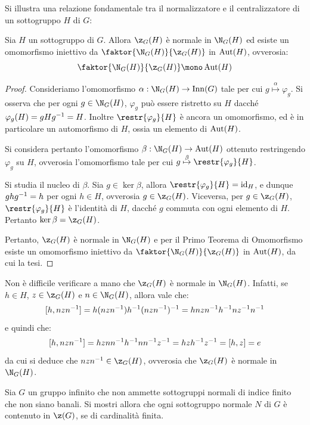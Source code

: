 \documentclass[11pt]{scrartcl}
\begin{document}
	Si illustra una relazione fondamentale tra il normalizzatore e il centralizzatore
	di un sottogruppo $H$ di $G$:
	
	\begin{proposition}
		\label{prop:norm_centr}
		Sia $H$ un sottogruppo di $G$. Allora $\z_G(H)$ è normale in $\N_G(H)$ ed
		esiste un omomorfismo iniettivo da $\faktor{\N_G(H)}{\z_G(H)}$ in
		$\operatorname{Aut}(H)$, ovverosia:
		\[ \faktor{\N_G(H)}{\z_G(H)} \mono \Aut(H) \]
	\end{proposition}
	
	\begin{proof}
		Consideriamo l'omomorfismo $\alpha : \N_G(H) \to \Inn(G)$ tale per cui
		$g \overset{\alpha}{\mapsto} \varphi_g$. Si osserva che per ogni $g \in \N_G(H)$, $\varphi_g$ può
		essere ristretto su $H$ dacché $\varphi_g(H) = gHg^{-1} = H$. Inoltre
		$\restr{\varphi_g}{H}$ è ancora un omomorfismo, ed è in particolare un
		automorfismo di $H$, ossia un elemento di $\operatorname{Aut}(H)$. \medskip
		
		
		Si considera pertanto l'omomorfismo $\beta : \N_G(H) \to \Aut(H)$ ottenuto
		restringendo $\varphi_g$ su $H$, ovverosia l'omomorfismo tale per cui
		$g \overset{\beta}{\mapsto} \restr{\varphi_g}{H}$. \medskip
		
		
		Si studia il nucleo di $\beta$. Sia $g \in \ker \beta$, allora $\restr{\varphi_g}{H} = \id_H$, e dunque $ghg^{-1} = h$ per ogni $h \in H$, ovverosia $g \in \z_G(H)$.
		Viceversa, per $g \in \z_G(H)$, $\restr{\varphi_g}{H}$ è l'identità di $H$, dacché
		$g$ commuta con ogni elemento di $H$. Pertanto $\ker \beta = \z_G(H)$. \medskip
		
		
		Pertanto, $\z_G(H)$ è normale in $\N_G(H)$ e per il Primo Teorema di Omomorfismo
		esiste un omomorfismo iniettivo da $\faktor{\N_G(H)}{\z_G(H)}$ in
		$\operatorname{Aut}(H)$, da cui la tesi.
	\end{proof}
	
	\begin{remark}
		Non è difficile verificare a mano che $\z_G(H)$ è normale in $\N_G(H)$. Infatti,
		se $h \in H$, $z \in \z_G(H)$ e $n \in \N_G(H)$, allora vale che:
		\[ [h, nzn^{-1}] = h (nzn^{-1}) h^{-1} (nzn^{-1})^{-1}= hnzn^{-1} h^{-1} n z^{-1} n^{-1} \]
		e quindi che:
		\[ [h, nzn^{-1}] = hz n n^{-1} h^{-1} n n^{-1} z^{-1} = hzh^{-1} z^{-1} = [h, z] = e \]
		da cui si deduce che $nzn\inv \in \z_G(H)$, ovverosia che $\z_G(H)$ è normale
		in $\N_G(H)$.
	\end{remark}
	
	\begin{exercise}[$\star$]
		Sia $G$ un gruppo infinito che non ammette sottogruppi normali di indice finito che
		non siano banali. Si mostri allora che ogni sottogruppo normale $N$ di $G$
		è contenuto in $\z(G)$, se di cardinalità finita.
	\end{exercise}
	
\end{document}
